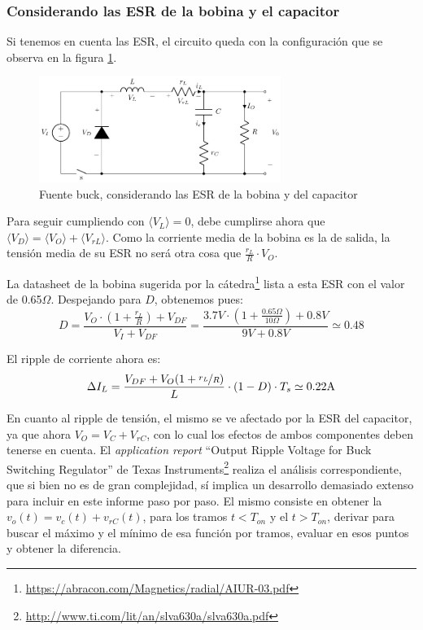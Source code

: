 \documentclass[e4_tp1_main.tex]{subfiles}
\begin{document}
\subsubsection{Considerando las ESR de la bobina y el capacitor}

Si tenemos en cuenta las ESR, el circuito queda con la configuraci\'on que se observa en la figura \ref{fig:buck-esrs}.

\begin{figure}[ht]
	\centering
	\includegraphics[width=0.7\textwidth]{images/ej2/buck_esrs.pdf}
	\caption{Fuente buck, considerando las ESR de la bobina y del capacitor}
	\label{fig:buck-esrs}
\end{figure}


Para seguir cumpliendo con $\langle V_L \rangle = 0$, debe cumplirse ahora que $\langle V_D \rangle = \langle V_O \rangle + \langle V_{rL} \rangle$. Como la corriente media de la bobina es la de salida, la tensi\'on media de su ESR no ser\'a otra cosa que $\frac{r_L}{R} \cdot V_O$. 

La datasheet de la bobina sugerida por la 
c\'atedra\footnote{
	\url{https://abracon.com/Magnetics/radial/AIUR-03.pdf}
} lista a esta ESR con el valor de 0.65$\Omega$.
Despejando para $D$, obtenemos pues:
\begin{equation}
	D = \frac{V_O \cdot \left( 1+ \frac{r_L}{R}\right)+ V_{DF}}{V_I + V_{DF}} 
= \frac{3.7V \cdot \left( 1+ \frac{0.65\Omega}{10\Omega}\right) + 0.8V}{9V + 0.8V} 
\simeq 0.48 
\end{equation}


El ripple de corriente ahora es:
\begin{equation}
	\Delta I_L = \frac{V_{DF} + V_O(1+\nicefrac{r_L}{R})}{L} \cdot (1-D) \cdot T_s \simeq 0.22\text{A} 
\end{equation}

En cuanto al ripple de tensi\'on, el mismo se ve afectado por la ESR del capacitor, ya que ahora $V_O = V_C + V_{rC}$, con lo cual los efectos de ambos componentes deben tenerse en cuenta. El \textit{application report} ``Output Ripple Voltage for Buck Switching Regulator'' de Texas Instruments\footnote{ 
	\url{http://www.ti.com/lit/an/slva630a/slva630a.pdf}
} realiza el an\'alisis correspondiente, que si bien no es de gran complejidad, s\'i implica un desarrollo demasiado extenso para incluir en este informe paso por paso. El mismo consiste en obtener la $v_o(t) = v_c(t) + v_{rC}(t)$, para los tramos $t<T_{on}$ y el $t>T_{on}$, derivar para buscar el m\'aximo y el m\'inimo de esa funci\'on por tramos, evaluar en esos puntos y obtener la diferencia.
\end{document}

